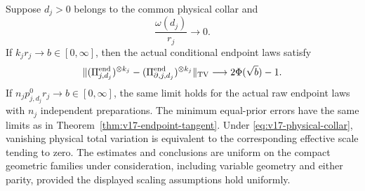 \begin{theorem}
\label{thm:v17-endpoint-physical}
Suppose $d_j>0$ belongs to the common physical collar and
\begin{equation}\label{eq:v17-physical-collar}
                       \frac{\omega(d_j)}{r_j}\longrightarrow0.
\end{equation}
If $k_jr_j\to b\in[0,\infty]$, then the actual conditional
endpoint laws satisfy
\begin{equation}\label{eq:v17-physical-conditional}
 \| (\Pi^{\rm end}_{j,d_j})^{\otimes k_j}
       -(\Pi^{\rm end}_{\partial,j,d_j})^{\otimes k_j}\|_{\rm TV}
                       \longrightarrow 2\Phi(\sqrt b)-1.
\end{equation}
If $n_jp_{j,d_j}^0r_j\to b\in[0,\infty]$, the same limit holds
for the actual raw endpoint laws with $n_j$ independent preparations.
The minimum equal-prior errors have the same limits as in
Theorem~\ref{thm:v17-endpoint-tangent}. Under
\eqref{eq:v17-physical-collar}, vanishing physical total variation is
equivalent to the corresponding effective scale tending to zero.
The estimates and conclusions are uniform on the compact geometric
families under consideration, including variable geometry and either
parity, provided the displayed scaling assumptions hold uniformly.
\end{theorem}
